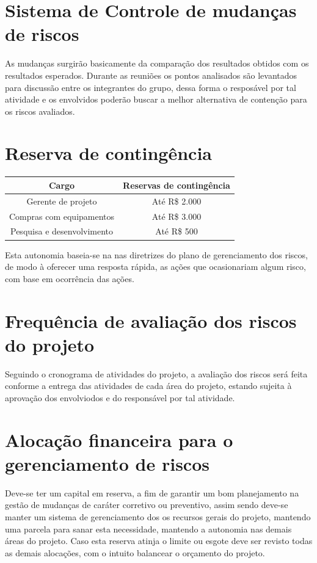 \documentclass[12pt,openright,oneside,a4paper,brazil]{abntex2}
\begin{document}
\section{Sistema de Controle de mudanças de riscos}
As mudanças surgirão basicamente da comparação dos resultados obtidos com os resultados esperados. Durante as reuniões os pontos analisados são levantados para discussão entre os integrantes do grupo, dessa forma o resposável por tal atividade e os envolvidos poderão buscar a melhor alternativa de contenção para os riscos avaliados. 

\section{Reserva de contingência}
\begin{table}[h]
\centering
\begin{tabular}{|c|c|}
Cargo & Reservas de contingência\\
\hline
Gerente de projeto & Até R\$ 2.000\\
\hline
Compras com equipamentos & Até R\$ 3.000\\
\hline
Pesquisa e desenvolvimento & Até R\$ 500\\
\hline
\end{tabular}
\end{table}

Esta autonomia baseia-se na nas diretrizes do plano de gerenciamento dos riscos, de modo à oferecer uma resposta rápida, as ações que ocasionariam algum risco, com base em ocorrência das ações. 
\section{Frequência de avaliação dos riscos do projeto}
Seguindo o cronograma de atividades do projeto, a avaliação dos riscos será feita conforme a entrega das atividades de cada área do projeto, estando sujeita à aprovação dos envolviodos e do responsável por tal atividade.

\section{Alocação financeira para o gerenciamento de riscos}
Deve-se ter um capital em reserva, a fim de garantir um bom planejamento na gestão de mudanças de caráter corretivo ou preventivo, assim sendo deve-se manter um sistema de gerenciamento dos os recursos gerais do projeto, mantendo uma parcela para sanar esta necessidade, mantendo a autonomia nas demais áreas do projeto.
Caso esta reserva atinja o limite ou esgote deve ser revisto todas as demais alocações, com o intuito balancear o orçamento do projeto.
\end{document}
